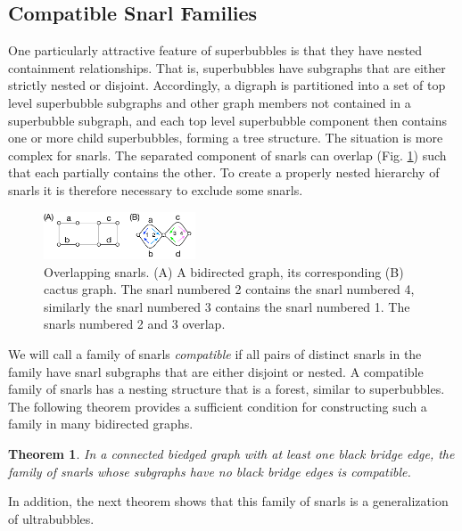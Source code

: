 \documentclass[11pt]{ucthesis}
\newtheorem{theorem}{Theorem}
\begin{document}
\subsection{Compatible Snarl Families}

One particularly attractive feature of superbubbles is that they have nested containment relationships. That is, superbubbles have subgraphs that are either strictly nested or disjoint. Accordingly, a digraph is partitioned into a set of top level superbubble subgraphs and other graph members not contained in a superbubble subgraph, and each top level superbubble component then contains one or more child superbubbles, forming a tree structure. The situation is more complex for snarls. The separated component of snarls can overlap (Fig. \ref{fig:overlapping_snarls}) such that each partially contains the other. To create a properly nested hierarchy of snarls it is therefore necessary to exclude some snarls.

\begin{figure}
\centering
\includegraphics[width=0.4\textwidth]{snarlfigures/fig4.pdf}
\caption{\label{fig:overlapping_snarls} Overlapping snarls. (A) A bidirected graph, its corresponding (B) cactus graph. The snarl numbered 2 contains the snarl numbered 4, similarly the snarl numbered 3 contains the snarl numbered 1. The snarls numbered 2 and 3 overlap.}
\end{figure}

We will call a family of snarls \textit{compatible} if all pairs of distinct snarls in the family have snarl subgraphs that are either disjoint or nested. A compatible family of snarls has a nesting structure that is a forest, similar to superbubbles. The following theorem provides a sufficient condition for constructing such a family in many bidirected graphs.

\begin{theorem}
	In a connected biedged graph with at least one black bridge edge, the family of snarls whose subgraphs have no black bridge edges is compatible.
	\label{theorem_no_bridges_is_compatible}
\end{theorem}

\noindent In addition, the next theorem shows that this family of snarls is a generalization of ultrabubbles.
\end{document}
